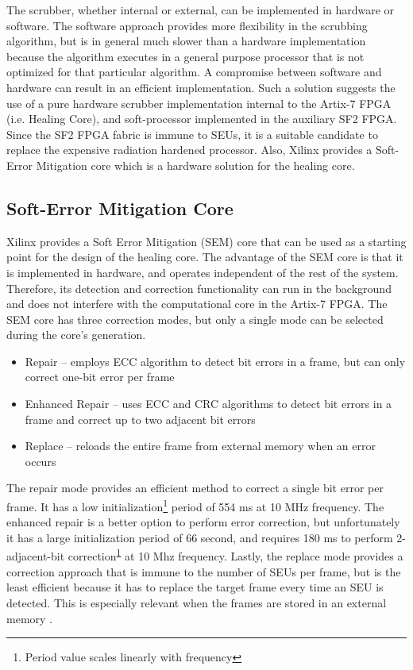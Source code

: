 The scrubber, whether internal or external, can be implemented in hardware or software. The software approach provides more flexibility in the scrubbing algorithm, but is in general much slower than a hardware implementation because the algorithm executes in a general purpose processor that is not optimized for that particular algorithm. A compromise between software and hardware can result in an efficient implementation. Such a solution suggests the use of a pure hardware scrubber implementation internal to the Artix-7 FPGA (i.e. Healing Core), and soft-processor implemented in the auxiliary SF2 FPGA. Since the SF2 FPGA fabric is immune to SEUs, it is a suitable candidate to replace the expensive radiation hardened processor. Also, Xilinx provides a Soft-Error Mitigation core which is a hardware solution for the healing core.

\subsection{Soft-Error Mitigation Core}
Xilinx provides a Soft Error Mitigation (SEM) core that can be used as a starting point for the design of the healing core. The advantage of the SEM core is that it is implemented in hardware, and operates independent of the rest of the system. Therefore, its detection and correction functionality can run in the background and does not interfere with the computational core in the Artix-7 FPGA. The SEM core has three correction modes, but only a single mode can be selected during the core's generation. 

\begin{itemize}
    \item Repair -- employs ECC algorithm to detect bit errors in a frame, but can only correct one-bit error per frame
    \item Enhanced Repair -- uses ECC and CRC algorithms to detect bit errors in a frame and correct up to two adjacent bit errors
    \item Replace -- reloads the entire frame from external memory when an error occurs
\end{itemize}   

The repair mode provides an efficient method to correct a single bit error per frame. It has a low initialization\footnote{\label{note1}Period value scales linearly with frequency} period of 554 ms at 10 MHz frequency. The enhanced repair is a better option to perform error correction, but unfortunately it has a large initialization period of 66 second, and requires 180 ms to perform 2-adjacent-bit correction\textsuperscript{\ref{note1}} at 10 Mhz frequency. Lastly, the replace mode provides a correction approach that is immune to the number of SEUs per frame, but is the least efficient because it has to replace the target frame every time an SEU is detected. This is especially relevant when the frames are stored in an external memory \cite{SEM.Xilinx-15}.  


